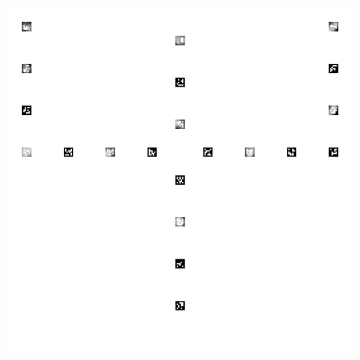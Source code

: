 \documentclass[../Head/report.tex]{subfiles}
\begin{document}
\begin{figure}[H]
\begin{subfigure}[t]{.20\textwidth}
        \caption{}
        \label{fig:vision_navigation_one_pattern_board_missing_markers}
    \end{subfigure}
         \hspace{0.2em}
    \begin{subfigure}[t]{.20\textwidth}
        \centering
        \includegraphics[width=\textwidth]{../Figures/vision_navigation/grid_board_new_200_big_onepattern_missing_markers_wear.png}
        \caption{}
        \label{fig:vision_navigation_one_pattern_board_missing_markers_wear}
    \end{subfigure}
    \caption{}
    \label{fig:vision_navigation_boards}
\end{figure}
\end{document}
